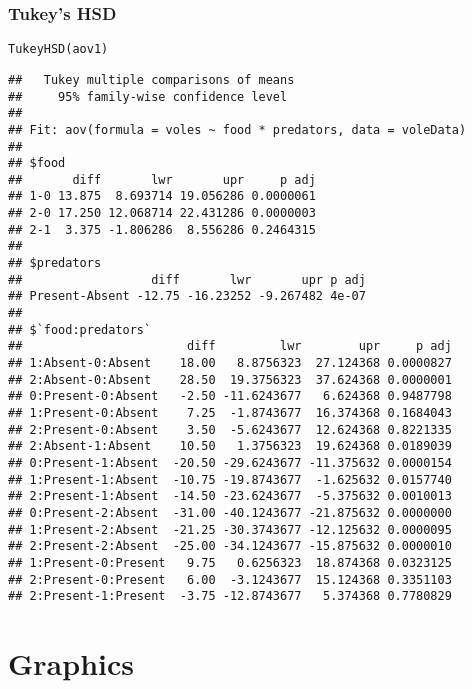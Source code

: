 \documentclass[color=usenames,dvipsnames]{beamer}\usepackage[]{graphicx}\usepackage[]{color}
\makeatletter
\newcommand{\hlstd}[1]{\textcolor[rgb]{0,0,0}{#1}}%
\newcommand{\hlkwd}[1]{\textcolor[rgb]{0.004,0.004,0.506}{#1}}%
\newenvironment{kframe}{%
 \def\at@end@of@kframe{}%
 \ifinner\ifhmode%
  \def\at@end@of@kframe{\end{minipage}}%
  \begin{minipage}{\columnwidth}%
 \fi\fi%
 \def\FrameCommand##1{\hskip\@totalleftmargin \hskip-\fboxsep
 \colorbox{shadecolor}{##1}\hskip-\fboxsep
     \hskip-\linewidth \hskip-\@totalleftmargin \hskip\columnwidth}%
 \MakeFramed {\advance\hsize-\width
   \@totalleftmargin\z@ \linewidth\hsize
   \@setminipage}}%
 {\par\unskip\endMakeFramed%
 \at@end@of@kframe}
\newenvironment{knitrout}{}{} %
\makeatother
\begin{document}
\begin{frame}[fragile]
  \frametitle{Tukey's HSD}
\begin{knitrout}\tiny
{}\color{fgcolor}\begin{kframe}
\begin{alltt}
\hlkwd{TukeyHSD}\hlstd{(aov1)}
\end{alltt}
\begin{verbatim}
##   Tukey multiple comparisons of means
##     95% family-wise confidence level
## 
## Fit: aov(formula = voles ~ food * predators, data = voleData)
## 
## $food
##       diff       lwr       upr     p adj
## 1-0 13.875  8.693714 19.056286 0.0000061
## 2-0 17.250 12.068714 22.431286 0.0000003
## 2-1  3.375 -1.806286  8.556286 0.2464315
## 
## $predators
##                  diff       lwr       upr p adj
## Present-Absent -12.75 -16.23252 -9.267482 4e-07
## 
## $`food:predators`
##                       diff         lwr        upr     p adj
## 1:Absent-0:Absent    18.00   8.8756323  27.124368 0.0000827
## 2:Absent-0:Absent    28.50  19.3756323  37.624368 0.0000001
## 0:Present-0:Absent   -2.50 -11.6243677   6.624368 0.9487798
## 1:Present-0:Absent    7.25  -1.8743677  16.374368 0.1684043
## 2:Present-0:Absent    3.50  -5.6243677  12.624368 0.8221335
## 2:Absent-1:Absent    10.50   1.3756323  19.624368 0.0189039
## 0:Present-1:Absent  -20.50 -29.6243677 -11.375632 0.0000154
## 1:Present-1:Absent  -10.75 -19.8743677  -1.625632 0.0157740
## 2:Present-1:Absent  -14.50 -23.6243677  -5.375632 0.0010013
## 0:Present-2:Absent  -31.00 -40.1243677 -21.875632 0.0000000
## 1:Present-2:Absent  -21.25 -30.3743677 -12.125632 0.0000095
## 2:Present-2:Absent  -25.00 -34.1243677 -15.875632 0.0000010
## 1:Present-0:Present   9.75   0.6256323  18.874368 0.0323125
## 2:Present-0:Present   6.00  -3.1243677  15.124368 0.3351103
## 2:Present-1:Present  -3.75 -12.8743677   5.374368 0.7780829
\end{verbatim}
\end{kframe}
\end{knitrout}
\end{frame}



\section{Graphics}
\end{document}
